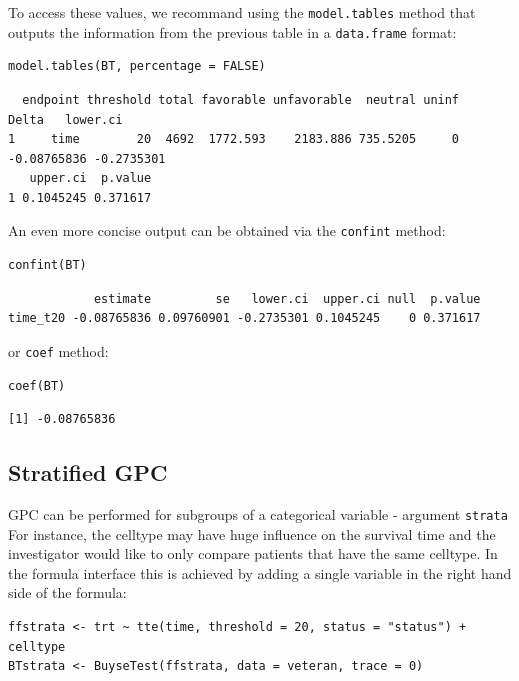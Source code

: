 \documentclass[12pt]{article}
\begin{document}
\bigskip

To access these values, we recommand using the \texttt{model.tables} method
that outputs the information from the previous table in a \texttt{data.frame}
format:

\lstset{language=r,label= ,caption= ,captionpos=b,numbers=none}
\begin{lstlisting}
model.tables(BT, percentage = FALSE)
\end{lstlisting}

\begin{verbatim}
  endpoint threshold total favorable unfavorable  neutral uninf       Delta   lower.ci
1     time        20  4692  1772.593    2183.886 735.5205     0 -0.08765836 -0.2735301
   upper.ci  p.value
1 0.1045245 0.371617
\end{verbatim}


\bigskip

An even more concise output can be obtained via the \texttt{confint} method:
\lstset{language=r,label= ,caption= ,captionpos=b,numbers=none}
\begin{lstlisting}
confint(BT)
\end{lstlisting}

\begin{verbatim}
            estimate         se   lower.ci  upper.ci null  p.value
time_t20 -0.08765836 0.09760901 -0.2735301 0.1045245    0 0.371617
\end{verbatim}


or \texttt{coef} method:
\lstset{language=r,label= ,caption= ,captionpos=b,numbers=none}
\begin{lstlisting}
coef(BT)
\end{lstlisting}

\begin{verbatim}
[1] -0.08765836
\end{verbatim}



\clearpage

\subsection{Stratified GPC}
\label{sec:org150313f}

GPC can be performed for subgroups of a categorical variable \hfill -
argument \texttt{strata} \newline For instance, the celltype may have huge
influence on the survival time and the investigator would like to only
compare patients that have the same celltype. In the formula interface
this is achieved by adding a single variable in the right hand side of
the formula:
\lstset{language=r,label= ,caption= ,captionpos=b,numbers=none}
\begin{lstlisting}
ffstrata <- trt ~ tte(time, threshold = 20, status = "status") + celltype
BTstrata <- BuyseTest(ffstrata, data = veteran, trace = 0)
\end{lstlisting}
\end{document}

